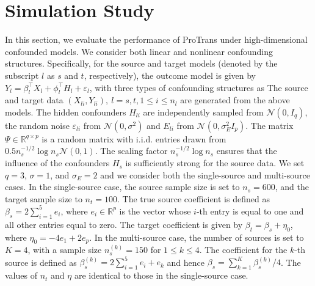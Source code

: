 \documentclass[12pt]{article}
\begin{document}
\section{Simulation Study}
\label{sec:simulation}

In this section, we evaluate the performance of ProTrans under high-dimensional confounded models. We consider both linear and nonlinear confounding structures. Specifically, for the source and target models (denoted by the subscript $l$ as $s$ and $t$, respectively), the outcome model is given by
$Y_l = \beta_l^\top X_l + \phi_l^\top H_l + \varepsilon_l$, 
with three types of confounding structures as
The source and target data $(X_{li},Y_{li}), \ l=s,t, 1\le i \le n_l$ are generated from the above models. The hidden confounders $H_{li}$ are independently sampled from $\mathcal{N}(0, I_q)$, the random noise $\varepsilon_{li}$ from $\mathcal{N}(0,\sigma^2)$ and  $E_{li}$ from $\mathcal{N}(0,\sigma_E^2 I_p)$. The matrix $\Psi \in \mathbb{R}^{q\times p}$ is a random matrix with i.i.d. entries drawn from $0.5 n_s^{-1/2}\log n_s \mathcal{N}(0,1)$. The scaling factor $n_s^{-1/2}\log n_s$ ensures that the influence of the confounders $H_s$ is sufficiently strong for the source data. We set $q = 3$, $\sigma = 1$, and $\sigma_E = 2$ and we consider both the single-source and multi-source cases. In the single-source case, the source sample size is set to $n_s = 600$, and the target sample size to $n_t = 100$. The true source coefficient is defined as $\beta_s = 2\sum_{i=1}^5 e_i$, where $e_i\in \mathbb{R}^p$ is the vector whose $i$-th entry is equal to one and all other entries equal to zero. The target coefficient is given by $\beta_t = \beta_s + \eta_0$, where $\eta_0 = -4e_1 + 2 e_{p}$. In the multi-source case, the number of sources is set to $K = 4$, with a sample size $n_s^{(k)} = 150$ for $1 \le k \le 4$. The coefficient for the $k$-th source is defined as $\beta_s^{(k)} = 2\sum_{i=1}^5 e_i +e_k$ and hence $\beta_s = \sum_{k=1}^K \beta_s^{(k)}/4$. The values of $n_t$ and $\eta$ are identical to those in the single-source case.
\end{document}

